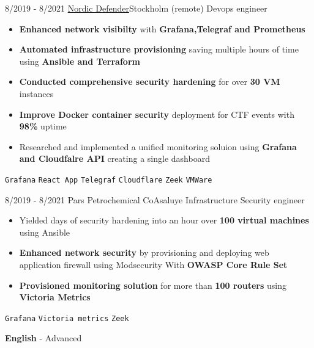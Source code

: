 \documentclass[9pt]{developercv} %
\begin{document}
\begin{center}
\end{center}
\vspace{5pt}
\begin{entrylist}
    \entry
    {8/2019 - 8/2021}
    {\href{https://nordicdefender.com/}{Nordic Defender}\newline\small\textnormal{Stockholm (remote)}}
    {Devops engineer}
    {\vspace{-6pt}
        \begin{itemize}[itemsep=2pt,topsep=0pt,parsep=0pt,partopsep=0pt, leftmargin=-1pt]
            \item{\textbf{Enhanced network visibilty} with \textbf{Grafana,Telegraf and Prometheus}}
            \item{\textbf{Automated infrastructure provisioning} saving multiple hours of time using \textbf{Ansible and Terraform}}
            \item{\textbf{Conducted comprehensive security hardening} for over \textbf{30 VM} instances}
            \item{\textbf{Improve Docker container security} deployment for CTF events with \textbf{98\%} uptime}
            \item{Researched and implemented a unified monitoring soluion using \textbf{Grafana and Cloudfalre API} creating a single dashboard}
        \end{itemize}
        \texttt{Grafana} \slashsep \texttt{React App} \slashsep \texttt{Telegraf} \slashsep \texttt{Cloudflare} \slashsep \texttt{Zeek} \slashsep \texttt{VMWare}}
\end{entrylist}
\begin{center}
\end{center}
\vspace{5pt}
\begin{entrylist}
    \entry
    {8/2019 - 8/2021}
    {{Pars Petrochemical Co}\newline\small\textnormal{Asaluye}}
    {Infrastructure Security engineer}
    {\vspace{-6pt}
        \begin{itemize}[itemsep=2pt,topsep=0pt,parsep=0pt,partopsep=0pt, leftmargin=-1pt]
            \item{Yielded days of security hardening into an hour over \textbf{100 virtual machines} using Ansible}
            \item{\textbf{Enhanced network security} by provisioning and deploying web
                  application firewall using Modsecurity With \textbf{OWASP Core Rule Set}}
            \item{\textbf{Provisioned monitoring solution} for more than \textbf{100 routers} using \textbf{Victoria Metrics}}

        \end{itemize}
        \texttt{Grafana} \slashsep \texttt{Victoria metrics}  \slashsep \texttt{Zeek} }
\end{entrylist}
\vspace{-10 pt}
\vspace{-6pt}

\hspace{26mm} \textbf{English} - Advanced

\end{document}
